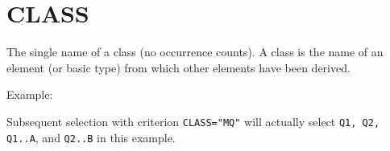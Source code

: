 \section{CLASS}
\label{sec:class} 
The single name of a class (no occurrence counts). A class is the name
of an element (or basic type) from which other elements have been
derived. 

Example: 

Subsequent selection with criterion \texttt{CLASS="MQ"} will actually select 
\texttt{Q1, Q2, Q1..A}, and \texttt{Q2..B} in this example. 


